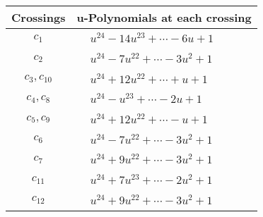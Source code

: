 \documentclass[1p]{elsarticle_modified}
\theoremstyle{definition}
\begin{document}
\begin{tabular}{m{50pt}|m{274pt}}
Crossings & \hspace{64pt}u-Polynomials at each crossing \\
\hline $$\begin{aligned}c_{1}\end{aligned}$$&$\begin{aligned}
&u^{24}-14 u^{23}+\cdots-6 u+1
\end{aligned}$\\
\hline $$\begin{aligned}c_{2}\end{aligned}$$&$\begin{aligned}
&u^{24}-7 u^{22}+\cdots-3 u^2+1
\end{aligned}$\\
\hline $$\begin{aligned}c_{3},c_{10}\end{aligned}$$&$\begin{aligned}
&u^{24}+12 u^{22}+\cdots+u+1
\end{aligned}$\\
\hline $$\begin{aligned}c_{4},c_{8}\end{aligned}$$&$\begin{aligned}
&u^{24}- u^{23}+\cdots-2 u+1
\end{aligned}$\\
\hline $$\begin{aligned}c_{5},c_{9}\end{aligned}$$&$\begin{aligned}
&u^{24}+12 u^{22}+\cdots- u+1
\end{aligned}$\\
\hline $$\begin{aligned}c_{6}\end{aligned}$$&$\begin{aligned}
&u^{24}-7 u^{22}+\cdots-3 u^2+1
\end{aligned}$\\
\hline $$\begin{aligned}c_{7}\end{aligned}$$&$\begin{aligned}
&u^{24}+9 u^{22}+\cdots-3 u^2+1
\end{aligned}$\\
\hline $$\begin{aligned}c_{11}\end{aligned}$$&$\begin{aligned}
&u^{24}+7 u^{23}+\cdots-2 u^2+1
\end{aligned}$\\
\hline $$\begin{aligned}c_{12}\end{aligned}$$&$\begin{aligned}
&u^{24}+9 u^{22}+\cdots-3 u^2+1
\end{aligned}$\\
\hline
\end{tabular}\\~\\
\end{document}
